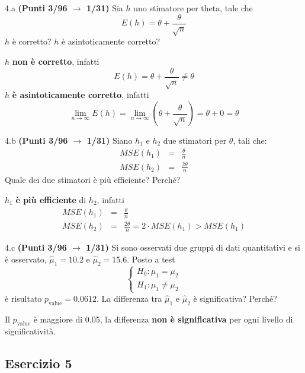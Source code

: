 \documentclass[
  11pt,
]{book}
\theoremstyle{mytheoremstyle}
\theoremstyle{mydefstyle}
\newenvironment{sol}
  {
  \begin{tcolorbox}[enhanced,breakable,arc=0.1mm,boxrule=1pt,colback=white,colframe=iblue,
  title=\bf \fontfamily{lmss}\selectfont \hspace{.5 cm} Soluzione,drop fuzzy shadow]

}{
\end{tcolorbox}
  }
\begin{document}
4.a \textbf{(Punti 3/96 \(\rightarrow\) 1/31)} Sia \(h\) uno stimatore per theta, tale che
\[
E(h)=\theta+\frac\theta {\sqrt{ n}}
\]
\(h\) è corretto? \(h\) è asintoticamente corretto?

\begin{sol}
\(h\) \textbf{non è corretto}, infatti
\[
E(h)=\theta+\frac\theta {\sqrt{ n}}\neq\theta
\]
\(h\) \textbf{è asintoticamente corretto}, infatti
\[
\lim_{n\to\infty}E(h)=\lim_{n\to\infty}\left(\theta+\frac\theta {\sqrt{ n}}\right)=\theta+0=\theta
\]

\end{sol}

4.b \textbf{(Punti 3/96 \(\rightarrow\) 1/31)} Siano \(h_1\) e \(h_2\) due stimatori per \(\theta\), tali che:
\begin{eqnarray*}
MSE(h_1) &=&   \frac\theta n\\
MSE(h_2) &=&   \frac{2\theta} n
\end{eqnarray*}
Quale dei due stimatori è più efficiente? Perché?

\begin{sol}
\(h_1\) \textbf{è più efficiente} di \(h_2\), infatti
\begin{eqnarray*}
MSE(h_1) &=&   \frac\theta n\\
MSE(h_2) &=&   \frac{2\theta} n =2\cdot MSE(h_1)>MSE(h_1)
\end{eqnarray*}

\end{sol}

4.c \textbf{(Punti 3/96 \(\rightarrow\) 1/31)} Si sono osservati due gruppi di dati quantitativi e si è osservato, \(\hat\mu_1=10.2\) e \(\hat\mu_2=15.6\). Posto a test
\[
\begin{cases}
H_0:\mu_1=\mu_2\\
H_1:\mu_1\ne \mu_2
\end{cases}
\]
è risultato \(p_\text{value}=0.0612\). La differenza tra \(\hat\mu_1\) e \(\hat\mu_2\) è significativa? Perché?

\begin{sol}
Il \(p_\text{value}\) è maggiore di 0.05, la differenza \textbf{non è significativa} per ogni livello di significatività.

\end{sol}

\subsection{Esercizio 5}\label{esercizio-5-1}
\end{document}
